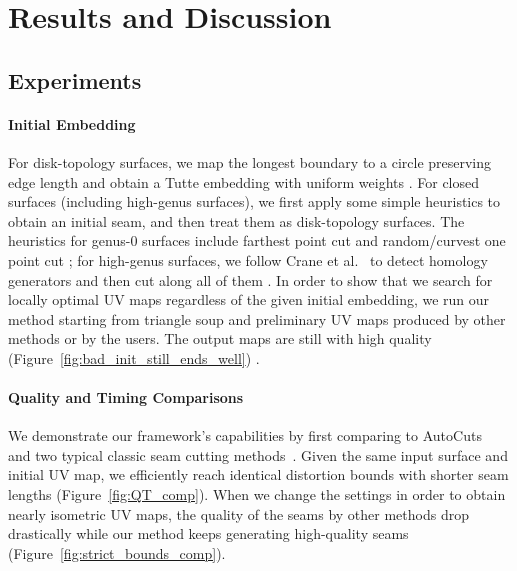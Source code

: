 
\section{Results and Discussion}
\label{sec:results}

\subsection{Experiments}

\paragraph{Initial Embedding} For disk-topology surfaces, we map the longest boundary to a circle preserving edge length and obtain a Tutte embedding with uniform weights . For closed surfaces (including high-genus surfaces), we first apply some simple heuristics to obtain an initial seam, and then treat them as disk-topology surfaces. 
The heuristics for genus-0 surfaces include farthest point cut and random/curvest one point cut ; for high-genus surfaces, we follow Crane et al.~ to detect homology generators and then cut along all of them \minchen{[TODO]}.
In order to show that we search for locally optimal UV maps regardless of the given initial embedding, we run our method starting from triangle soup and preliminary UV maps produced by other methods or by the users. The output maps are still with high quality (Figure~\ref{fig:bad_init_still_ends_well}) \minchen{[TODO]}.

\paragraph{Quality and Timing Comparisons}  We demonstrate our framework's capabilities by first comparing to AutoCuts~\cite{Poranne2017Autocuts} and two typical classic seam cutting methods~\cite{Gu2002Geometry,Sheffer2002Seamster}. Given the same input surface and initial UV map, we efficiently reach identical distortion bounds with shorter seam lengths (Figure~\ref{fig:QT_comp}). 
When we change the settings in order to obtain nearly isometric UV maps, the quality of the seams by other methods drop drastically while our method keeps generating high-quality seams (Figure~\ref{fig:strict_bounds_comp}).

